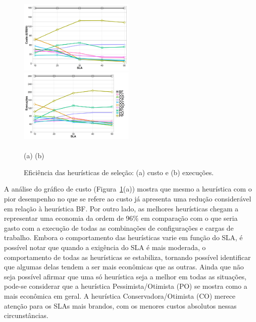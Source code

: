 \documentclass[12pt]{article}
\begin{document}
\begin{figure}[t]
\centering\footnotesize
  \includegraphics[trim = 5mm 10mm 5mm 10mm, width=0.5\textwidth]{img/graphic-cost-capacity.png}~~~
  \includegraphics[trim = 5mm 10mm 5mm 10mm, width=0.5\textwidth]{img/graphic-time-capacity.png}
  \\~\\\hspace{0.255\textwidth}(a) \hfill (b) \hspace{0.225\textwidth}
  \caption{\label{fig:cost-time}Eficiência das heurísticas de seleção: (a) custo e (b) execuções.}
\end{figure}

A análise do gráfico de custo (Figura~\ref{fig:cost-time}(a)) mostra que mesmo a heurística com o pior desempenho no que se refere ao custo já apresenta uma redução considerável 
em relação à heurística BF. Por outro lado, as melhores heurísticas chegam a 
representar uma economia da ordem de 96\% em comparação com o que seria gasto
com a execução de todas as combinações de configurações e cargas de trabalho.
Embora o comportamento das heurísticas varie em função do SLA, é possível notar
que quando a exigência do SLA é mais moderada, o comportamento de todas as heurísticas
se estabiliza, tornando possível identificar que algumas delas tendem a
ser mais econômicas que as outras. Ainda que não seja possível afirmar que uma só 
heurística seja a melhor em todas as situações, pode-se considerar que a heurística
Pessimista/Otimista (PO) se mostra como a mais econômica em geral. A heurística
Conservadora/Otimista (CO) merece atenção para os SLAs mais brandos, com os menores
custos absolutos nessas circunstâncias. 
\end{document}

